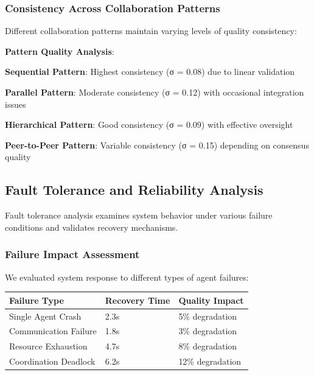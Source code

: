 \subsubsection*{Consistency Across Collaboration Patterns}

Different collaboration patterns maintain varying levels of quality consistency:

\begin{successbox}
\textbf{Pattern Quality Analysis}:
\begin{compactlist}
    \item \textbf{Sequential Pattern}: Highest consistency (σ = 0.08) due to linear validation
    \item \textbf{Parallel Pattern}: Moderate consistency (σ = 0.12) with occasional integration issues
    \item \textbf{Hierarchical Pattern}: Good consistency (σ = 0.09) with effective oversight
    \item \textbf{Peer-to-Peer Pattern}: Variable consistency (σ = 0.15) depending on consensus quality
\end{compactlist}
\end{successbox}

\subsection*{Fault Tolerance and Reliability Analysis}

Fault tolerance analysis examines system behavior under various failure conditions and validates recovery mechanisms.

\subsubsection*{Failure Impact Assessment}

We evaluated system response to different types of agent failures:

\begin{center}
\begin{tabular}{@{}lll@{}}
\toprule
\textbf{Failure Type} & \textbf{Recovery Time} & \textbf{Quality Impact} \\
\midrule
Single Agent Crash & 2.3s & 5\% degradation \\
Communication Failure & 1.8s & 3\% degradation \\
Resource Exhaustion & 4.7s & 8\% degradation \\
Coordination Deadlock & 6.2s & 12\% degradation \\
\bottomrule
\end{tabular}
\end{center}

